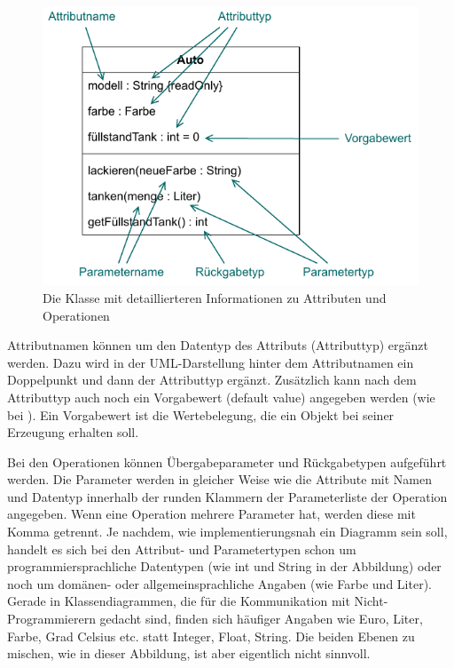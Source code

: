 \begin{figure}[h!]
	\centering
	\includegraphics[scale=1.0]{Bilder/Kapitel-8/klasse_auto_detailliert.pdf}
	\caption[Die Klasse  mit detaillierteren Informationen]{Die Klasse  mit detaillierteren Informationen zu Attributen und Operationen}
	\label{fig:klasse_auto_detailliert}
\end{figure}

\pagebreak %

Attributnamen können um den Datentyp des Attributs (Attributtyp) ergänzt werden. Dazu wird in der UML-Darstellung hinter dem Attributnamen ein Doppelpunkt und dann der Attributtyp ergänzt. Zusätzlich kann nach dem Attributtyp auch noch ein Vorgabewert (default value) angegeben werden (wie bei ). Ein Vorgabewert ist die Wertebelegung, die ein Objekt bei seiner Erzeugung erhalten soll.

Bei den Operationen können Übergabeparameter und Rückgabetypen aufgeführt werden. Die Parameter werden in gleicher Weise wie die Attribute mit Namen und Datentyp innerhalb der runden Klammern der Parameterliste der Operation angegeben. Wenn eine Operation mehrere Parameter hat, werden diese mit Komma getrennt. Je nachdem, wie implementierungsnah ein Diagramm sein soll, handelt es sich bei den Attribut- und Parametertypen schon um programmiersprachliche Datentypen (wie int und String in der Abbildung) oder noch um domänen- oder allgemeinsprachliche Angaben (wie Farbe und Liter). Gerade in Klassen\-diagrammen, die für die Kommunikation mit Nicht-Programmierern gedacht sind, finden sich häufiger Angaben wie Euro, Liter, Farbe, Grad Celsius etc. statt Integer, Float, String. Die beiden Ebenen zu mischen, wie in dieser Abbildung, ist aber eigentlich nicht sinnvoll. 


